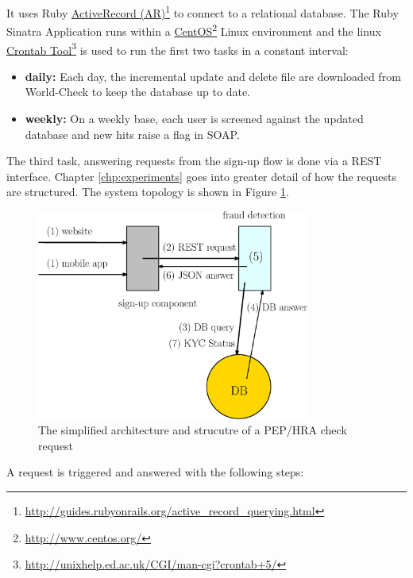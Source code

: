 \documentclass[a4paper, oneside]{csthesis}
\newcommand\fnurl[2]{%
  \href{#2}{#1}\footnote{\url{#2}}%
}
\begin{document}
It uses Ruby \fnurl{ActiveRecord (AR)}{http://guides.rubyonrails.org/active_record_querying.html} to connect to a relational database. The Ruby Sinatra Application runs within a \fnurl{CentOS}{http://www.centos.org/} Linux environment and the linux \fnurl{Crontab Tool}{http://unixhelp.ed.ac.uk/CGI/man-cgi?crontab+5/} is used to run the first two tasks in a constant interval:
\begin{itemize}
\item \textbf{daily:} Each day, the incremental update and delete file are downloaded from World-Check to keep the database up to date.
\item \textbf{weekly:} On a weekly base, each user is screened against the updated database and new hits raise a flag in SOAP.
\end{itemize}

The third task, answering requests from the sign-up flow is done via a REST interface. Chapter \ref{chp:experiments} goes into greater detail of how the requests are structured. The system topology is shown in Figure \ref{fig:fraud-arch}.

\begin{figure}[tb]
    \begin{center}
        \includegraphics[width=0.8\textwidth]{figures/fraud-arch.eps}
    \end{center}
    \caption{The simplified architecture and strucutre of a PEP/HRA check request}
    \label{fig:fraud-arch}
\end{figure}

A request is triggered and answered with the following steps:
\end{document}
